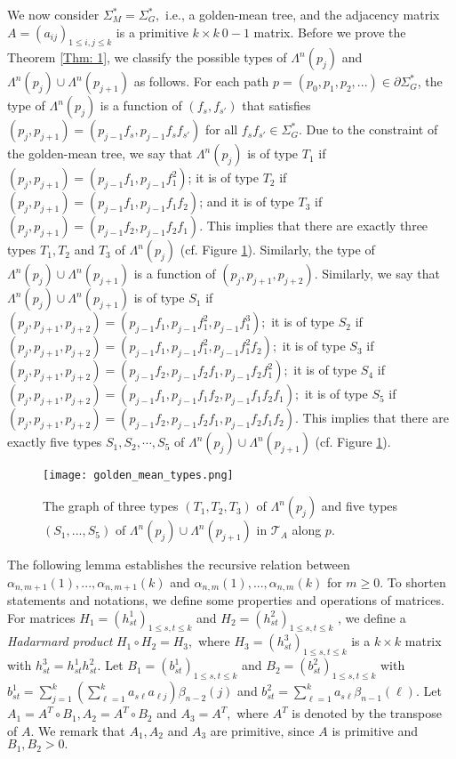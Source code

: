 \documentclass{amsart}
\theoremstyle{definition}
\begin{document}
We now consider $\Sigma_M^*=\Sigma_G^*,$ i.e., a golden-mean tree, and the adjacency matrix  $A=(a_{ij})_{1\leq i,j\leq k}$ is a primitive $k\times k~0-1$ matrix. Before we prove the Theorem \ref{Thm: 1}, we classify the possible types of $\Lambda^n(p_j)$ and $\Lambda^n(p_j)\cup\Lambda^n(p_{j+1})$ as follows. For each path $p=(p_0,p_1,p_2,...)\in\partial\Sigma^*_G$, the type of $\Lambda^n(p_j)$ is a function of $(f_s,f_{s'})$ that satisfies $(p_j,p_{j+1})=(p_{j-1}f_s,p_{j-1}f_sf_{s'})$ for all $f_sf_{s'}\in \Sigma_G^*.$ Due to the constraint of the golden-mean tree, we say that $\Lambda^n(p_j)$ is of type $T_1$ if $(p_j,p_{j+1})=(p_{j-1}f_1,p_{j-1}f_1^2)$; it is of type $T_2$ if $(p_j,p_{j+1})=(p_{j-1}f_1,p_{j-1}f_1f_2)$; and it is of type $T_3$ if $(p_{j},p_{j+1})=(p_{j-1}f_2,p_{j-1}f_2f_1)$. This implies that there are exactly three types $T_1, T_2$ and $T_3$ of $\Lambda^n(p_j)$ (cf. Figure \ref{3types}). Similarly, the type of $\Lambda^n(p_{j})\cup\Lambda^n(p_{j+1})$ is a function of $(p_j,p_{j+1},p_{j+2})$. Similarly, we say that $\Lambda^n(p_{j})\cup\Lambda^n(p_{j+1})$ is of type $S_1$ if $(p_j,p_{j+1},p_{j+2})=(p_{j-1}f_1,p_{j-1}f_1^2,p_{j-1}f_1^3);$ it is of type $S_2$ if $(p_j,p_{j+1},p_{j+2})=(p_{j-1}f_1,p_{j-1}f_1^2,p_{j-1}f_1^2f_2);$ it is of type $S_3$ if $(p_j,p_{j+1},p_{j+2})=(p_{j-1}f_2,p_{j-1}f_2f_1,p_{j-1}f_2f_1^2);$ it is of type $S_4$ if $(p_j,p_{j+1},p_{j+2})=(p_{j-1}f_1,p_{j-1}f_1f_2,p_{j-1}f_1f_2f_1);$ it is of type $S_5$ if $(p_j,p_{j+1},p_{j+2})=(p_{j-1}f_2,p_{j-1}f_2f_1,p_{j-1}f_2f_1f_2).$ This implies that there are exactly five types $S_1,S_2,\cdots, S_5$ of $\Lambda^n(p_j)\cup\Lambda^n(p_{j+1})$ (cf. Figure \ref{3types}).

\begin{figure} %
	\centering %
	\texttt{[image: golden\_mean\_types.png]} %
	\caption{The graph of three types $(T_1,T_2,T_3)$ of $\Lambda^n(p_j)$ and five types $(S_1,...,S_5)$ of $\Lambda^n(p_j)\cup\Lambda^n(p_{j+1})$ in $\mathcal{T}_A$ along $p.$} %
	\label{3types} %
\end{figure}

The following lemma establishes the recursive relation between $\alpha_{n,m+1}(1),...,\alpha_{n,m+1}(k)$ and $\alpha_{n,m}(1),...,\alpha_{n,m}(k)$ for $m\geq 0$. To shorten statements and notations, we define some properties and operations of matrices. For matrices $H_1=(h_{st}^1)_{1\leq s,t\leq k}$ and $H_2=(h_{st}^2)_{1\leq s,t\leq k}$ , we define a \emph{Hadarmard product} $H_1\circ H_2=H_3,$ where $H_3=(h_{st}^3)_{1\leq s,t\leq k}$ is a $k\times k$ matrix with $h_{st}^3=h_{st}^1h_{st}^2.$ Let $B_1=(b_{st}^1)_{1\leq s,t\leq k}$ and $B_2=(b_{st}^2)_{1\leq s,t\leq k}$ with $b_{st}^1=\sum_{j=1}^k(\sum_{\ell=1}^k a_{s\ell}a_{\ell j})\beta_{n-2}(j)$ and $b_{st}^2=\sum_{\ell=1}^ka_{s\ell}\beta_{n-1}(\ell)$. Let $A_1=A^T\circ B_1,A_2=A^T\circ B_2$ and $A_3=A^T,$ where $A^T$ is denoted by the transpose of $A.$ We remark that $A_1,A_2$ and $A_3$ are primitive, since $A$ is primitive and $B_1,B_2>0.$
\end{document}

